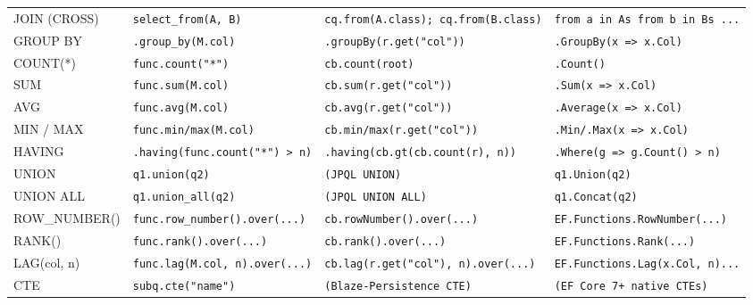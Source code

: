 \begin{landscape}
\begin{longtable}{p{4.5cm}p{5.5cm}p{5.5cm}p{5.5cm}}
JOIN (CROSS)
  & \texttt{select\_from(A, B)}
  & \texttt{cq.from(A.class); cq.from(B.class)}
  & \texttt{from a in As from b in Bs ...} \\[4pt]

GROUP BY
  & \texttt{.group\_by(M.col)}
  & \texttt{.groupBy(r.get("col"))}
  & \texttt{.GroupBy(x => x.Col)} \\[4pt]

COUNT(*)
  & \texttt{func.count("*")}
  & \texttt{cb.count(root)}
  & \texttt{.Count()} \\[4pt]

SUM
  & \texttt{func.sum(M.col)}
  & \texttt{cb.sum(r.get("col"))}
  & \texttt{.Sum(x => x.Col)} \\[4pt]

AVG
  & \texttt{func.avg(M.col)}
  & \texttt{cb.avg(r.get("col"))}
  & \texttt{.Average(x => x.Col)} \\[4pt]

MIN / MAX
  & \texttt{func.min/max(M.col)}
  & \texttt{cb.min/max(r.get("col"))}
  & \texttt{.Min/.Max(x => x.Col)} \\[4pt]

HAVING
  & \texttt{.having(func.count("*") > n)}
  & \texttt{.having(cb.gt(cb.count(r), n))}
  & \texttt{.Where(g => g.Count() > n)} \\[4pt]

UNION
  & \texttt{q1.union(q2)}
  & \texttt{(JPQL UNION)}
  & \texttt{q1.Union(q2)} \\[4pt]

UNION ALL
  & \texttt{q1.union\_all(q2)}
  & \texttt{(JPQL UNION ALL)}
  & \texttt{q1.Concat(q2)} \\[4pt]

ROW\_NUMBER()
  & \texttt{func.row\_number().over(...)}
  & \texttt{cb.rowNumber().over(...)}
  & \texttt{EF.Functions.RowNumber(...)} \\[4pt]

RANK()
  & \texttt{func.rank().over(...)}
  & \texttt{cb.rank().over(...)}
  & \texttt{EF.Functions.Rank(...)} \\[4pt]

LAG(col, n)
  & \texttt{func.lag(M.col, n).over(...)}
  & \texttt{cb.lag(r.get("col"), n).over(...)}
  & \texttt{EF.Functions.Lag(x.Col, n)...} \\[4pt]

CTE
  & \texttt{subq.cte("name")}
  & \texttt{(Blaze-Persistence CTE)}
  & \texttt{(EF Core 7+ native CTEs)} \\[4pt]

\end{longtable}
\end{landscape}

